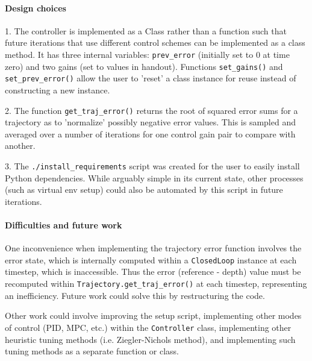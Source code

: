 \documentclass[11pt]{article}
\begin{document}
\paragraph{Design choices}
1. The controller is implemented as a Class rather than a function such that future iterations that use different 
control schemes can be implemented as a class method. It has three internal variables: 
\texttt{prev\_error} (initially set to 0 at time zero) and two gains (set to values in handout). Functions \texttt{set\_gains()} and \texttt{set\_prev\_error()} allow the user to 'reset' 
a class instance for reuse instead of constructing a new instance.
\par 2. The function \texttt{get\_traj\_error()} returns the root of squared error sums for a trajectory as to 'normalize'
possibly negative error values. This is sampled and averaged over a number of iterations for one control gain pair
to compare with another.
\par 3. The \texttt{./install\_requirements} script was created for the user to easily install Python dependencies.
While arguably simple in its current state, other processes (such as virtual env setup) could also be automated by this
 script in future iterations.

\paragraph{Difficulties and future work}
One inconvenience when implementing the trajectory error function involves the error state, which is internally
computed within a \texttt{ClosedLoop} instance at each timestep, which is inaccessible. Thus the error (reference - depth)
value must be recomputed within \texttt{Trajectory.get\_traj\_error()} at each timestep, representing an inefficiency.
Future work could solve this by restructuring the code.
\par
Other work could involve improving the setup script,
implementing other modes of control (PID, MPC, etc.) within the \texttt{Controller} class,
implementing other heuristic tuning methods (i.e. Ziegler-Nichols method),
and implementing such tuning methods as a separate function or class.
\end{document}
